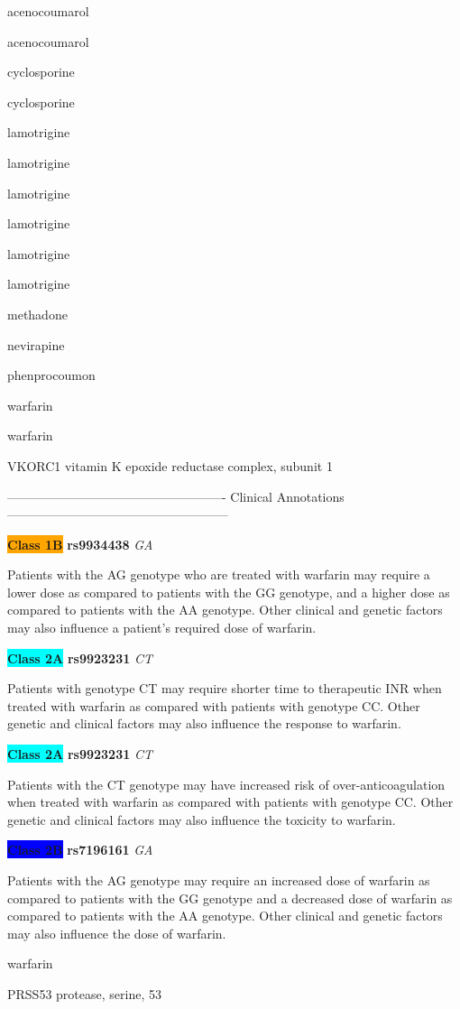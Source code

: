 \documentclass{resume} %
\begin{document}
\begin{rSection}{ acenocoumarol }
\begin{rSection}{ acenocoumarol }
\begin{rSection}{ cyclosporine }
\begin{rSection}{ cyclosporine }
\begin{rSection}{ lamotrigine }
\begin{rSection}{ lamotrigine }
\begin{rSection}{ lamotrigine }
\begin{rSection}{ lamotrigine }
\begin{rSection}{ lamotrigine }
\begin{rSection}{ lamotrigine }
\begin{rSection}{ methadone }
\begin{rSection}{ nevirapine }
\begin{rSection}{ phenprocoumon }
\begin{rSection}{ warfarin }
\begin{rSection}{ warfarin }
\begin{rSubsection}{ VKORC1 }{ vitamin K epoxide reductase complex, subunit 1 }{}{}
\item[] ---------------------------------------------------- Clinical Annotations -----------------------------------------------------\newline
\item \textbf{\colorbox{orange} {Class 1B}} \textbf{ rs9934438 } \textit{ GA }
\item[] Patients with the AG genotype who are treated with warfarin may require a lower dose as compared to patients with the GG genotype, and a higher dose as compared to patients with the AA genotype. Other clinical and genetic factors may also influence a patient’s required dose of warfarin. \item \textbf{\colorbox{cyan} {Class 2A}} \textbf{ rs9923231 } \textit{ CT }
\item[] Patients with genotype CT may require shorter time to therapeutic INR when treated with warfarin as compared with patients with genotype CC. Other genetic and clinical factors may also influence the response to warfarin. \item \textbf{\colorbox{cyan} {Class 2A}} \textbf{ rs9923231 } \textit{ CT }
\item[] Patients with the CT genotype may have increased risk of over-anticoagulation when treated with warfarin as compared with patients with genotype CC. Other genetic and clinical factors may also influence the toxicity to warfarin.\item \textbf{\colorbox{blue} {Class 2B}} \textbf{ rs7196161 } \textit{ GA }
\item[] Patients with the AG genotype may require an increased dose of warfarin as compared to patients with the GG genotype and a decreased dose of warfarin as compared to patients with the AA genotype. Other clinical and genetic factors may also influence the dose of warfarin. 

\end{rSubsection}
\begin{rSection}{ warfarin }
\item[]
\begin{rSubsection}{ PRSS53 }{ protease, serine, 53 }{}{}
\item[]



\end{rSubsection}
\end{rSection}
\end{rSection}
\end{rSection}
\end{rSection}
\end{rSection}
\end{rSection}
\end{rSection}
\end{rSection}
\end{rSection}
\end{rSection}
\end{rSection}
\end{rSection}
\end{rSection}
\end{rSection}
\end{rSection}
\end{rSection}
\end{document}
